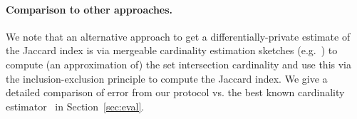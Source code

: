 \paragraph{Comparison to other approaches.}
%
We note that an alternative approach to get a differentially-private estimate of the Jaccard index is via mergeable cardinality estimation sketches (e.g.~\cite{ICML:HehTinCor23}) to compute (an approximation of) the set intersection cardinality and use this via the inclusion-exclusion principle to compute the Jaccard index.  
We give a detailed comparison of error from our protocol vs. the best known cardinality estimator~\cite{ICML:HehTinCor23} in Section~\ref{sec:eval}.



